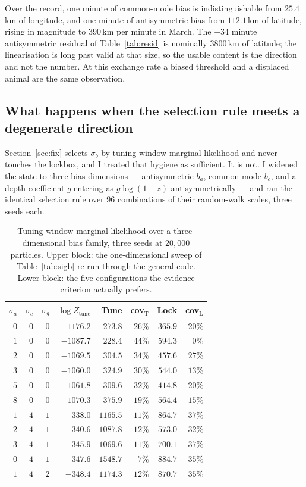 \documentclass[conference]{IEEEtran}
\begin{document}
Over the record, one minute of common-mode bias is indistinguishable from
$25.4$\,\si{\km} of longitude, and one minute of antisymmetric bias from
$112.1$\,\si{\km} of latitude, rising in magnitude to $390$\,\si{\km} per minute in
March. The $+34$ minute antisymmetric residual of Table~\ref{tab:resid} is
nominally $3800$\,\si{\km} of latitude; the linearisation is long past valid at that
size, so the usable content is the direction and not the number. At this exchange
rate a biased threshold and a displaced animal are the same observation.

\subsection{What happens when the selection rule meets a degenerate direction}
Section~\ref{sec:fix} selects $\sigma_b$ by tuning-window marginal likelihood and
never touches the lockbox, and I treated that hygiene as sufficient. It is not.
I widened the state to three bias dimensions --- antisymmetric $b_a$, common mode
$b_c$, and a depth coefficient $g$ entering as $g\log(1+z)$ antisymmetrically ---
and ran the identical selection rule over $96$ combinations of their random-walk
scales, three seeds each.

\begin{table}[t]
\caption{Tuning-window marginal likelihood over a three-dimensional bias family,
three seeds at $20{,}000$ particles. Upper block: the one-dimensional sweep of
Table~\ref{tab:sigb} re-run through the general code. Lower block: the five
configurations the evidence criterion actually prefers.}
\label{tab:grid}
\centering
\begin{tabular}{rrrrrrrr}
\toprule
$\sigma_a$ & $\sigma_c$ & $\sigma_g$ & $\log Z_\text{tune}$ & Tune & cov$_\text{T}$ & Lock & cov$_\text{L}$ \\
\midrule
$0$ & $0$ & $0$ & $-1176.2$ & $273.8$  & $26\%$ & $365.9$ & $20\%$ \\
$1$ & $0$ & $0$ & $-1087.7$ & $228.4$  & $44\%$ & $594.3$ & $0\%$  \\
$2$ & $0$ & $0$ & $-1069.5$ & $304.5$  & $34\%$ & $457.6$ & $27\%$ \\
$3$ & $0$ & $0$ & $-1060.0$ & $324.9$  & $30\%$ & $544.0$ & $13\%$ \\
$5$ & $0$ & $0$ & $-1061.8$ & $309.6$  & $32\%$ & $414.8$ & $20\%$ \\
$8$ & $0$ & $0$ & $-1070.3$ & $375.9$  & $19\%$ & $564.4$ & $15\%$ \\
\midrule
$1$ & $4$ & $1$ & $\mathbf{-338.0}$ & $1165.5$ & $11\%$ & $864.7$ & $37\%$ \\
$2$ & $4$ & $1$ & $-340.6$ & $1087.8$ & $12\%$ & $573.0$ & $32\%$ \\
$3$ & $4$ & $1$ & $-345.9$ & $1069.6$ & $11\%$ & $700.1$ & $37\%$ \\
$0$ & $4$ & $1$ & $-347.6$ & $1548.7$ & $7\%$  & $884.7$ & $35\%$ \\
$1$ & $4$ & $2$ & $-348.4$ & $1174.3$ & $12\%$ & $870.7$ & $35\%$ \\
\bottomrule
\end{tabular}
\end{table}
\end{document}
